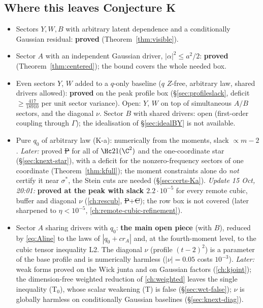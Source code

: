 \subsection{Where this leaves Conjecture K}
\begin{itemize}
\item Sectors $Y,W,B$ with arbitrary latent dependence and a conditionally Gaussian residual: \textbf{proved} (Theorem~\ref{thm:visible}).
\item Sector $A$ with an independent Gaussian driver, $|\alpha|^2\le a^2/2$: \textbf{proved} (Theorem~\ref{thm:centered}); the bound covers the whole needed box.
\item Even sectors $Y$, $W$ added to a $q$-only baseline ($q$ $Z$-free, arbitrary law, shared drivers allowed): \textbf{proved} on the peak profile box (\S\ref{sec:profileslack}, deficit $\ge\frac{417}{18910}$ per unit sector variance). Open: $Y$, $W$ on top of simultaneous $A/B$ sectors, and the diagonal $\nu$. Sector $B$ with shared drivers: open (first-order coupling through $\Gamma$); the idealisation of \S\ref{sec:idealBY} is not available.
\item Pure $q_0$ of arbitrary law (K-a): numerically from the moments, slack $\propto m-2$. \emph{Later:} proved \st{P} for all of $\Hc21(\C^2)$ and the one-coordinate star (\S\ref{sec:knext-star}), with a deficit for the nonzero-frequency sectors of one coordinate (Theorem~\ref{thm:kfull}); the moment constraints alone do \emph{not} certify it near $\sigma^*$, the Stein cuts are needed (\S\ref{sec:certs-Ka}). \emph{Update 15 Oct, 20:01:} \textbf{proved at the peak with slack $2.2\cdot10^{-5}$} for every remote cubic, buffer and diagonal $\nu$ (\autoref{ch:rescub}, \st{P}+\st{C}); the row box is not covered (later sharpened to $\eta<10^{-5}$, \autoref{ch:remote-cubic-refinement}).
\item Sector $A$ sharing drivers with $q_0$: \textbf{the main open piece} (with $B$), reduced by \eqref{eq:Aline} to the laws of $|q_0+cr_A|$ and, at the fourth-moment level, to the cubic
tensor inequality L2. The diagonal $\nu$ (profile $(t-2)^2$) is a parameter of the base profile and is numerically harmless ($|\nu|=0.05$ costs $10^{-3}$). \emph{Later:} weak forms proved on the Wick junta and on Gaussian factors (\autoref{ch:kjoint}); the dimension-free weighted reduction of \autoref{ch:weighted} leaves the single inequality (T$_0$), whose scalar weakening (T) is false (\S\ref{sec:wct-false}); $\nu$ is globally harmless on conditionally Gaussian baselines (\S\ref{sec:knext-diag}).
\end{itemize}
